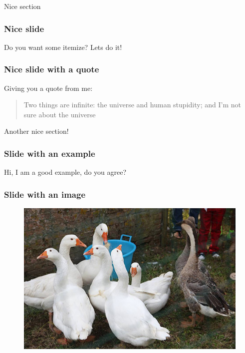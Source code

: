 \documentclass[xcolor=dvipsnames,aspectratio=169]{beamer}
\begin{document}
{\begin{section}{Nice section}
\begin{frame}[t]
\frametitle{Nice slide}
Do you want some itemize? Lets do it!
\begin{itemize}
\end{itemize}
\end{frame}

\begin{frame}[t]
\frametitle{Nice slide with a quote}
Giving you a quote from me:
\begin{quote}
\textcolor{RedEurac}{Two things are infinite: the universe and human stupidity; and I'm not sure about the universe} %
\end{quote} 
\end{frame}
\end{section}

\begin{section}{Another nice section!}
\begin{frame}[t]
\frametitle{Slide with an example}
\begin{example}
Hi, I am a good example, do you agree?
\end{example}
\end{frame}

\begin{frame}[t]
\frametitle{Slide with an image} 
\begin{figure}
  \centering
  \includegraphics[scale=0.22]{Immagini/duck.jpg}
\end{figure}
\end{frame}


\end{section}}
\end{document}
